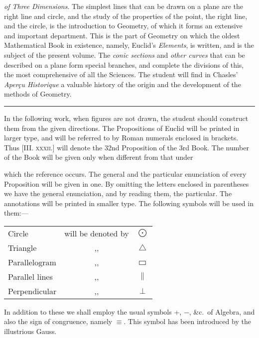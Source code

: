\documentclass[oneside]{book}
\newcommand\pgram{
	\setlength{\unitlength}{1pt}
	\begin{picture}(11,8)(0,0)
	\linethickness{0.5pt}
	\put(1,0){\line(1,0){9}}
	\put(1,0){\line(0,1){5}}
	\put(1,5){\line(1,0){9}}
	\put(10,0){\line(0,1){5}}
	\end{picture}}
\begin{document}
\textit{of Three Dimensions}. The simplest lines that can
be drawn on a plane are the right line and circle,
and the study of the properties of the point, the
right line, and the circle, is the introduction to
Geometry, of which it forms an extensive and important
department. This is the part of Geometry
on which the oldest Mathematical Book in existence,
namely, Euclid's \textit{Elements}, is written, and
is the subject of the present volume. The \textit{conic
sections} and \textit{other curves} that can be described on
a plane form special branches, and complete the
divisions of this, the most comprehensive of all the
Sciences. The student will find in Chasles' \textit{Aperçu
Historique} a valuable history of the origin and
the development of the methods of Geometry.

\vspace{0.2in}
\begin{center}
\rule[1ex]{5cm}{.2pt}
\end{center}
\vspace{0.2in}

In the following work, when figures are not
drawn, the student should construct them from the
given directions. The Propositions of Euclid will
be printed in larger type, and will be referred to
by Roman numerals enclosed in brackets. Thus
[III\@. \textsc{xxxii.}] will denote the 32nd Proposition
of the 3rd Book. The number of the Book will
be given only when different from that under

which the reference occurs. The general and the
particular enunciation of every Proposition will be
given in one. By omitting the letters enclosed
in parentheses we have the general enunciation,
and by reading them, the particular. The annotations
will be printed in smaller type.     The
following symbols will be used in them:---

\begin{tabular}{l c c}
Circle & will be denoted by & $\bigodot$ \\
Triangle & ,, & $\triangle$ \\
Parallelogram & ,, & $\pgram$ \\
Parallel lines & ,, & $\parallel$ \\
Perpendicular & ,, & $\perp$
\end{tabular}

In addition to these we shall employ the usual
symbols $+$, $-$, \&c.\ of Algebra, and also the sign
of congruence, namely $\equiv$. This symbol has been
introduced by the illustrious Gauss.
\end{document}

